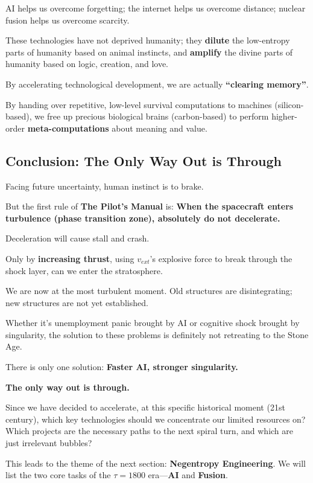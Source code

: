 AI helps us overcome forgetting; the internet helps us overcome distance; nuclear fusion helps us overcome scarcity.

These technologies have not deprived humanity; they \textbf{dilute} the low-entropy parts of humanity based on animal instincts, and \textbf{amplify} the divine parts of humanity based on logic, creation, and love.

By accelerating technological development, we are actually \textbf{``clearing memory''}.

By handing over repetitive, low-level survival computations to machines (silicon-based), we free up precious biological brains (carbon-based) to perform higher-order \textbf{meta-computations} about meaning and value.

\subsection{Conclusion: The Only Way Out is Through}

Facing future uncertainty, human instinct is to brake.

But the first rule of \textbf{The Pilot's Manual} is: \textbf{When the spacecraft enters turbulence (phase transition zone), absolutely do not decelerate.}

Deceleration will cause stall and crash.

Only by \textbf{increasing thrust}, using $v_{ext}$'s explosive force to break through the shock layer, can we enter the stratosphere.

We are now at the most turbulent moment. Old structures are disintegrating; new structures are not yet established.

Whether it's unemployment panic brought by AI or cognitive shock brought by singularity, the solution to these problems is definitely not retreating to the Stone Age.

There is only one solution: \textbf{Faster AI, stronger singularity.}

\textbf{The only way out is through.}

Since we have decided to accelerate, at this specific historical moment (21st century), which key technologies should we concentrate our limited resources on? Which projects are the necessary paths to the next spiral turn, and which are just irrelevant bubbles?

This leads to the theme of the next section: \textbf{Negentropy Engineering}. We will list the two core tasks of the $\tau=1800$ era---\textbf{AI} and \textbf{Fusion}.

